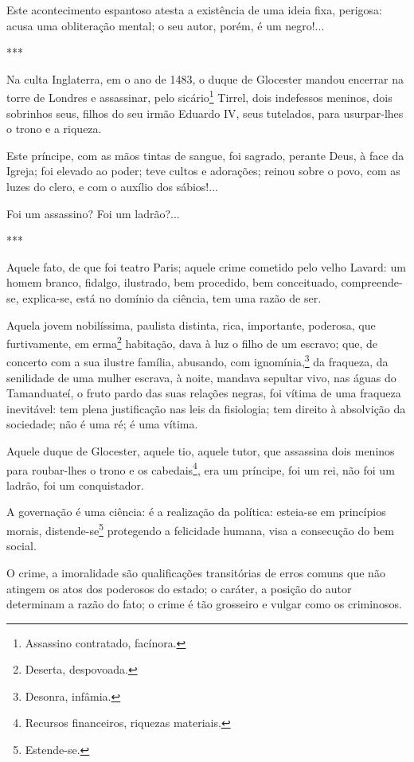 Este acontecimento espantoso atesta a existência de uma ideia fixa,
perigosa: acusa uma obliteração mental; o seu autor, porém, é um
negro!...

***

Na culta Inglaterra, em o ano de 1483, o duque de Glocester mandou
encerrar na torre de Londres e assassinar, pelo sicário\footnote{
  Assassino contratado, facínora.} Tirrel, dois indefessos meninos, dois
sobrinhos seus, filhos do seu irmão Eduardo IV, seus tutelados, para
usurpar-lhes o trono e a riqueza.

Este príncipe, com as mãos tintas de sangue, foi sagrado, perante Deus,
à face da Igreja; foi elevado ao poder; teve cultos e adorações; reinou
sobre o povo, com as luzes do clero, e com o auxílio dos sábios!...

Foi um assassino? Foi um ladrão?...

***

Aquele fato, de que foi teatro Paris; aquele crime cometido pelo velho
Lavard: um homem branco, fidalgo, ilustrado, bem procedido, bem
conceituado, compreende-se, explica-se, está no domínio da ciência, tem
uma razão de ser.

Aquela jovem nobilíssima, paulista distinta, rica, importante, poderosa,
que furtivamente, em erma\footnote{Deserta, despovoada.} habitação,
dava à luz o filho de um escravo; que, de concerto com a sua ilustre
família, abusando, com ignomínia,\footnote{Desonra, infâmia.} da
fraqueza, da senilidade de uma mulher escrava, à noite, mandava sepultar
vivo, nas águas do Tamanduateí, o fruto pardo das suas relações negras,
foi vítima de uma fraqueza inevitável: tem plena justificação nas leis
da fisiologia; tem direito à absolvição da sociedade; não é uma ré; é
uma vítima.

Aquele duque de Glocester, aquele tio, aquele tutor, que assassina dois
meninos para roubar-lhes o trono e os cabedais\footnote{Recursos
  financeiros, riquezas materiais.}, era um príncipe, foi um rei, não
foi um ladrão, foi um conquistador.

A governação é uma ciência: é a realização da política: esteia-se em
princípios morais, distende-se\footnote{Estende-se.} protegendo a
felicidade humana, visa a consecução do bem social.

O crime, a imoralidade são qualificações transitórias de erros comuns
que não atingem os atos dos poderosos do estado; o caráter, a posição do
autor determinam a razão do fato; o crime é tão grosseiro e vulgar como
os criminosos.

